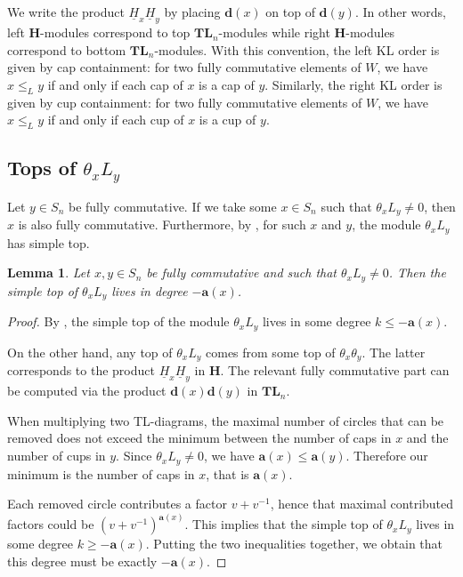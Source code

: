 \documentclass[a4paper]{amsart}
\newtheorem{lemma}[theorem]{Lemma}
\begin{document}
We write the product $\underline{H}_x\underline{H}_y$
by placing $\mathbf{d}(x)$ on top of $\mathbf{d}(y)$.
In other words, left $\mathbf{H}$-modules correspond to 
top $\mathbf{TL}_n$-modules while right 
$\mathbf{H}$-modules correspond to bottom $\mathbf{TL}_n$-modules.
With this convention, the left KL order is given by 
cap containment: for two fully commutative elements of $W$,
we have $x\leq_L y$ if and only if each cap of $x$ is a cap of $y$.
Similarly, the right  KL order is given by 
cup containment: for two fully commutative elements of $W$,
we have $x\leq_L y$ if and only if each cup of $x$ is a cup of $y$.

\subsection{Tops of $\theta_x L_y$}\label{s4.3}

Let $y\in S_n$ be fully commutative. If we take some $x\in S_n$
such that $\theta_x L_y\neq 0$, then $x$ is also fully commutative.
Furthermore, by \cite[Theorem~4.11(iii)]{BS}, for such $x$ and $y$,
the module $\theta_x L_y$ has simple top.

\begin{lemma}\label{lem:topxyfc}
Let $x,y\in S_n$ be fully commutative and such that 
$\theta_x L_y\neq 0$. Then the simple top of 
$\theta_x L_y$ lives in degree $-\mathbf{a}(x)$.
\end{lemma}

\begin{proof}
By \cite[Theorem~2.2]{KMM}, the simple top of the module $\theta_x L_y$
lives in some degree $k\leq -\mathbf{a}(x)$.

On the other hand, any top of $\theta_x L_y$ comes from some
top of $\theta_x \theta_y$. The latter corresponds to
the product  $\underline{H}_x\underline{H}_y$ in
$\mathbf{H}$. The relevant fully commutative part 
can be computed via the product 
$\mathbf{d}(x)\mathbf{d}(y)$ in $\mathbf{TL}_n$.

When multiplying two TL-diagrams, the maximal number of 
circles that can be removed does not exceed the minimum
between the number of caps in $x$ and the number of cups in $y$.
Since $\theta_x L_y\neq 0$, we have $\mathbf{a}(x)\leq \mathbf{a}(y)$.
Therefore our minimum is the number of caps in $x$, that is 
$\mathbf{a}(x)$. 

Each removed circle contributes a factor $v+v^{-1}$, hence that
maximal contributed factors could be $(v+v^{-1})^{\mathbf{a}(x)}$.
This implies that the simple top of $\theta_x L_y$
lives in some degree $k\geq -\mathbf{a}(x)$.
Putting the two inequalities together, 
we obtain that this degree must be exactly $-\mathbf{a}(x)$.
\end{proof}
\end{document}
